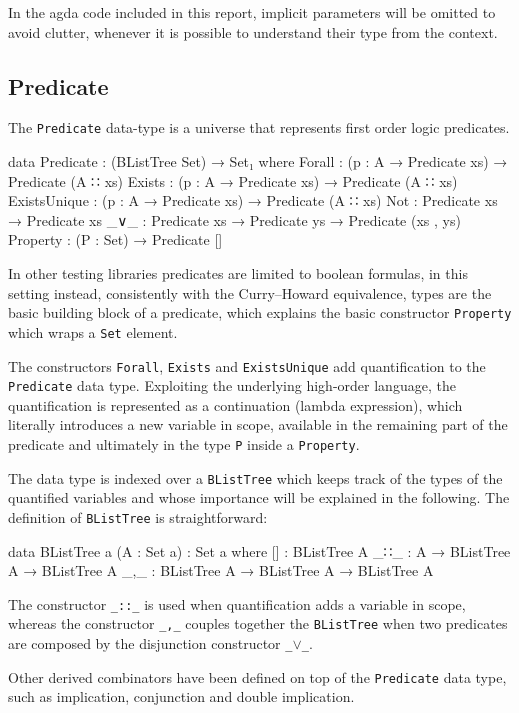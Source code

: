\documentclass[10pt,a4paper]{article}
\begin{document}
In the agda code included in this report, implicit parameters will be omitted to avoid clutter, whenever it is possible to understand their type from the context.
	
	\subsection{Predicate}
\label{sec:predicate}
The \texttt{Predicate} data-type is a universe that represents first order logic predicates.

\begin{code}
data Predicate : (BListTree Set) → Set₁ where
  Forall : (p : A → Predicate xs) → Predicate (A ∷ xs)
  Exists : (p : A → Predicate xs) → Predicate (A ∷ xs)
  ExistsUnique : (p : A → Predicate xs) → Predicate (A ∷ xs)
  Not : Predicate xs → Predicate xs
  _∨_ : Predicate xs → Predicate ys → Predicate (xs , ys)
  Property : (P : Set) → Predicate []
\end{code}

In other testing libraries predicates are limited to boolean formulas, in this setting instead, consistently with the Curry–Howard equivalence, types are the basic building block of a predicate, which explains the basic constructor \texttt{Property} which wraps a \texttt{Set} element.

The constructors \texttt{Forall}, \texttt{Exists} and \texttt{ExistsUnique} add quantification to the \texttt{Predicate} data type.
Exploiting the underlying high-order language, the quantification is represented as a continuation (lambda expression), which literally introduces a new variable in scope, available in the remaining part of the predicate and ultimately in  the type \texttt{P} inside a \texttt{Property}.

The data type is indexed over a \texttt{BListTree} which keeps track of the types of the quantified variables and whose importance will be explained in the following.
The definition of \texttt{BListTree} is straightforward:
\begin{code}
data BListTree {a} (A : Set a) : Set a where 
  [] : BListTree A
  _∷_ : A → BListTree A → BListTree A
  _,_ : BListTree A → BListTree A → BListTree A
\end{code}
The constructor \texttt{\_::\_} is used when quantification adds a variable in scope, whereas the constructor \texttt{\_,\_} couples together the \texttt{BListTree} when two predicates are composed by the disjunction constructor \texttt{\_$\vee$\_}.

Other derived combinators have been defined on top of the \texttt{Predicate} 
data type, such as implication, conjunction and double implication.
\end{document}
